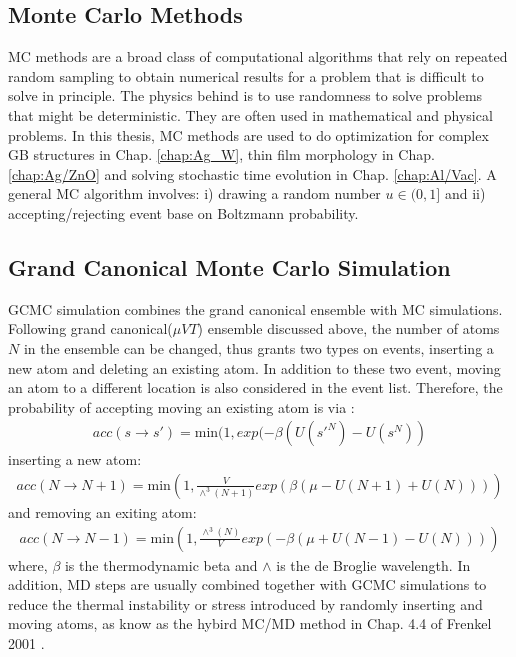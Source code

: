 \subsection{Monte Carlo Methods}
\label{Chap:Mech:GCMC:MC}

\ac{MC} methods are a broad class of computational algorithms that rely on repeated random sampling to obtain numerical results for a problem that is difficult to solve in principle. The physics behind is to use randomness to solve problems that might be deterministic. They are often used in mathematical \cite{hubbard2009modeling} and physical \cite{bortz1975new} problems. In this thesis, \ac{MC} methods are used to do optimization for complex \ac{GB} structures in Chap. \ref{chap:Ag_W}, thin film morphology in Chap. \ref{chap:Ag/ZnO} and solving stochastic time evolution in Chap. \ref{chap:Al/Vac}. A general \ac{MC} algorithm involves: i) drawing a random number $u \in (0,1]$ and ii) accepting/rejecting event base on Boltzmann probability.

\subsection{Grand Canonical Monte Carlo Simulation}
\label{Chap:Mech:GCMC:GCMC}

\ac{GCMC} simulation combines the grand canonical ensemble with \ac{MC} simulations. Following grand canonical($\mu VT$) ensemble discussed above, the number of atoms $N$ in the ensemble can be changed, thus grants two types on events, inserting a new atom and deleting an existing atom. In addition to these two event, moving an atom to a different location is also considered in the event list. Therefore, the probability of accepting moving an existing atom is via \cite{frenkel2001understanding}:
\begin{align}
acc(s \rightarrow s') = \text{min}(1, exp(-\beta(U(s'^N) - U(s^N))
\label{Chap:Meth:eq:acc:move}
\end{align}
inserting a new atom:
\begin{align}
acc(N \rightarrow N+1) = \text{min}(1, \frac{V}{\wedge^3(N+1)}exp(\beta(\mu - U(N + 1) + U(N)))) \label{Chap:Meth:eq:acc:insert}
\end{align}
and removing an exiting atom:
\begin{align}
acc(N \rightarrow N-1) = \text{min}(1, \frac{\wedge^3(N)}{V}exp(-\beta(\mu + U(N - 1) - U(N)))) \label{Chap:Meth:eq:acc:remove}
\end{align}
where, $\beta$ is the thermodynamic beta and $\wedge$ is the de Broglie wavelength. In addition, \ac{MD} steps are usually combined together with \ac{GCMC} simulations to reduce the thermal instability or stress introduced by randomly inserting and moving atoms, as know as the hybird \ac{MC}/\ac{MD} method in Chap. 4.4 of Frenkel 2001 \cite{frenkel2001understanding}.
